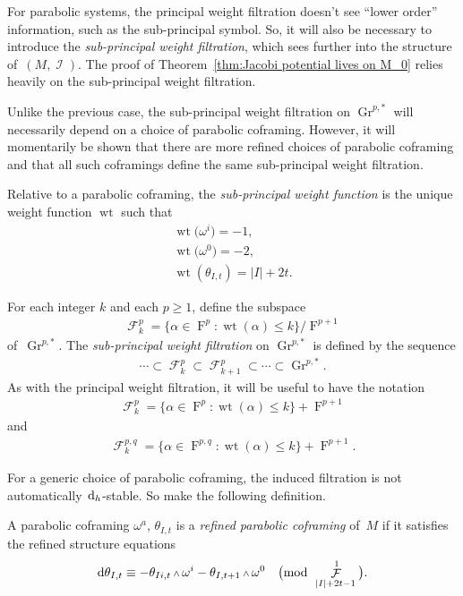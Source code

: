\documentclass[pdftex]{sigma}
\DeclareMathOperator{\Gr}{Gr}
\DeclareMathOperator{\I}{\mathcal{I}}
\renewcommand{\d}{{\rm d}}
\renewcommand{\mod}[1]{\quad\big(\mathrm{mod\enspace} #1\big)}
\newcommand{\w}{{\mathchoice{\,{\scriptstyle\wedge}\,}{{\scriptstyle\wedge}}
 {{\scriptscriptstyle\wedge}}{{\scriptscriptstyle\wedge}}}}
\newcommand{\thetas}[1]{\theta_{#1}}
\DeclareMathOperator{\pwf}{F}
\DeclareMathOperator{\swf}{\mathcal{F}}
\DeclareMathOperator{\wt}{\mathrm{wt}}
\renewcommand{\dh}{\ensuremath{\hspace{1pt} \d_h}}
\numberwithin{equation}{section}
\begin{document}
\begin{Example}
 For parabolic systems, the principal weight filtration doesn't see ``lower order'' information, such as the sub-principal symbol. So, it will also be necessary to introduce the \emph{sub-principal weight filtration}, which sees further into the structure of~$(M,\I)$. The proof of Theorem~\ref{thm:Jacobi potential lives on M_0} relies heavily on the sub-principal weight filtration.

 Unlike the previous case, the sub-principal weight filtration on $\Gr^{p,*}$ will necessarily depend on a choice of parabolic coframing. However, it will momentarily be shown that there are more refined choices of parabolic coframing and that all such coframings define the same sub-principal weight filtration.

 Relative to a parabolic coframing, the \emph{sub-principal weight function} is the unique weight function $\wt$ such that
 \begin{gather*}
 \wt\big(\omega^i\big) = -1, \\
 \wt\big(\omega^0\big) = -2, \\
 \wt(\thetas{I,t}) = |I| + 2t .
 \end{gather*}

 For each integer $k$ and each $p \ge 1$, define the subspace
 \begin{gather*}
 \swf^p_k = \big\{ \alpha \in \pwf^p \colon \wt(\alpha) \le k \big\}/ \pwf^{p+1}
 \end{gather*}
 of~$\Gr^{p,*}$.
 The \emph{sub-principal weight filtration} on $\Gr^{p,*}$ is defined by the sequence
 \begin{gather*}
 \cdots \subset \swf^p_k \subset \swf^p_{k+1} \subset \cdots \subset \Gr^{p,*} .
 \end{gather*}
 As with the principal weight filtration, it will be useful to have the notation
 \begin{gather*}
 \swf^p_k = \big\{ \alpha \in \pwf^p \colon \wt(\alpha) \le k \big\} + \pwf^{p+1}
 \end{gather*}
 and
 \begin{gather*}
 \swf^{p,q}_k = \big\{ \alpha \in \pwf^{p,q} \colon \wt(\alpha) \le k \big\} + \pwf^{p+1} .
 \end{gather*}

 For a generic choice of parabolic coframing, the induced filtration is not automatically $\dh$-stable. So make the following definition.
 \begin{Definition}
 A parabolic coframing $\omega^a$, $\thetas{I,t}$ is a \emph{refined parabolic coframing} of~$M$ if it satisfies the refined structure equations
 \begin{gather}\label{eq:refined structure eqs}
 \d\thetas{I,t} \equiv -\thetas{Ii,t}\w\omega^i -\thetas{I,t+1}\w\omega^0 \mod{\swf^1_{|I|+2t-1}}.
 \end{gather}
 \end{Definition}


\end{Example}
\end{document}
